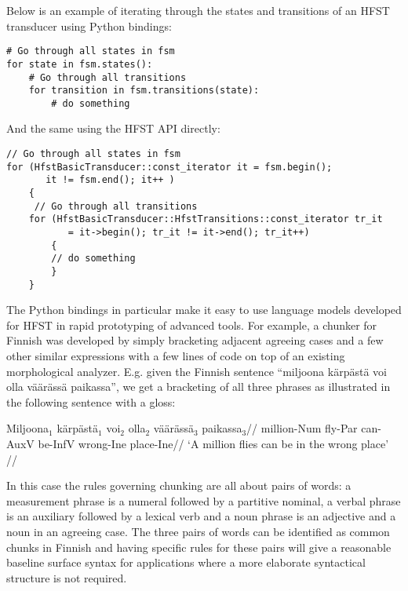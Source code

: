 \documentclass{llncs}
\begin{document}
Below is an example of iterating through the states and transitions of
an HFST transducer using Python bindings:

\begin{verbatim}
# Go through all states in fsm       
for state in fsm.states():
    # Go through all transitions                                               
    for transition in fsm.transitions(state):
        # do something
\end{verbatim}

And the same using the HFST API directly:

\begin{verbatim}
// Go through all states in fsm
for (HfstBasicTransducer::const_iterator it = fsm.begin();
       it != fsm.end(); it++ )      
    {      
     // Go through all transitions    
    for (HfstBasicTransducer::HfstTransitions::const_iterator tr_it  
           = it->begin(); tr_it != it->end(); tr_it++) 
        {
        // do something
        }
    }
\end{verbatim}

The Python bindings in particular make it easy to use language models
developed for HFST in rapid prototyping of advanced tools. For example, a
chunker for Finnish was developed by simply bracketing adjacent
agreeing cases and a few other similar expressions with a few lines of
code on top of an existing morphological analyzer. E.g.  given the Finnish sentence
``miljoona kärpästä voi olla väärässä paikassa'', we get a bracketing of all three
phrases as illustrated in the following sentence with a gloss:

\ex
\begingl[everygla=]
\gla Miljoona$_1$ kärpästä$_1$ voi$_2$ olla$_2$ väärässä$_3$ paikassa$_3$//
\glb million-{\sc Num} fly-{\sc Par} can-{\sc AuxV} be-{\sc InfV} wrong-{\sc Ine} place-{\sc Ine}//
\glft `A million flies can be in the wrong place' //
\endgl
\xe

In this case the rules governing chunking are all about pairs of words: a measurement
phrase is a numeral followed by a partitive nominal, a verbal phrase is an
auxiliary followed by a lexical verb and a noun phrase is an adjective and a noun
in an agreeing case.  The three pairs of words can be identified as common
chunks in Finnish and having specific rules for these pairs
will give a reasonable baseline surface syntax for applications where a more
elaborate syntactical structure is not required.
\end{document}
